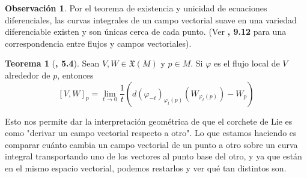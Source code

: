 \documentclass[spanish]{book}
\theoremstyle{definition}
\newtheorem*{teo}{Teorema}
\newtheorem*{obs}{Observación}
\newcommand{\X}{\mathfrak{X}}
\begin{document}
	\begin{obs}
		Por el teorema de existencia y unicidad de ecuaciones diferenciales, las curvas integrales de un campo vectorial suave en una variedad diferenciable existen y son únicas cerca de cada punto. (Ver \cite{Lee}\textbf{, 9.12} para una correspondencia entre flujos y campos vectoriales).
	\end{obs}
	\begin{teo}[\cite{DoCarmo}\textbf{, 5.4}]
		Sean $V,W\in\X(M)$ y $p\in M$. Si $\varphi$ es el flujo local de $V$ alrededor de $p$, entonces
		\[[V,W]_p=\lim_{t\to 0}\frac{1}{t}\left(d(\varphi_{-t})_{\varphi_t(p)}(W_{\varphi_t(p)})-W_p\right)\]
	\end{teo}
	Esto nos permite dar la interpretación geométrica de que el corchete de Lie es como "derivar un campo vectorial respecto a otro". Lo que estamos haciendo es comparar cuánto cambia un campo vectorial de un punto a otro sobre un curva integral transportando uno de los vectores al punto base del otro, y ya que están en el mismo espacio vectorial, podemos restarlos y ver qué tan distintos son.
\end{document}
